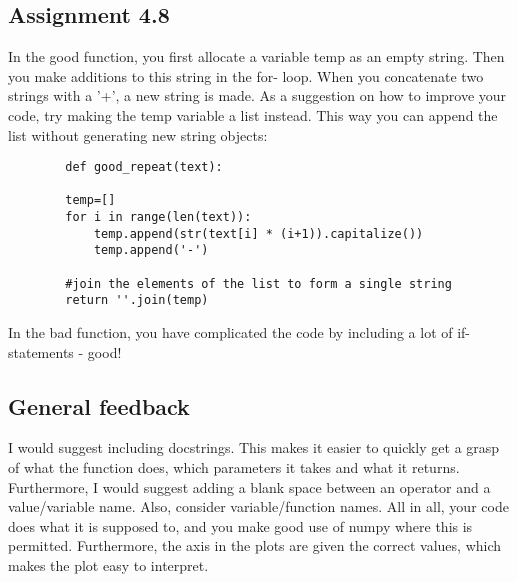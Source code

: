 \documentclass[a4paper]{article}
\begin{document}
    \subsection*{Assignment 4.8}

    In the good function, you first allocate a variable temp as an 
    empty string. Then you make additions to this string in the for-
    loop. When you concatenate two strings with a '+', a new string 
    is made. As a suggestion on how to improve your code, try making 
    the temp variable a list instead. This way you can append the 
    list without generating new string objects:\\
    \begin{verbatim}
        def good_repeat(text):

        temp=[]
        for i in range(len(text)):
            temp.append(str(text[i] * (i+1)).capitalize())
            temp.append('-')

        #join the elements of the list to form a single string
        return ''.join(temp)
    \end{verbatim}

    In the bad function, you have complicated the code by including 
    a lot of if-statements - good!
    
    
    
    \subsection*{General feedback}
   
    I would suggest including docstrings. This makes it easier to
    quickly get a grasp of what the function does, which parameters 
    it takes and what it returns. Furthermore, I would suggest adding 
    a blank space between an operator and a value/variable name. Also,
    consider variable/function names. All in all, your code does
    what it is supposed to, and you make good use of numpy where this 
    is permitted. Furthermore, the axis in the plots are given the correct
    values, which makes the plot easy to interpret.
    

    
    
    
    
    
\end{document}
